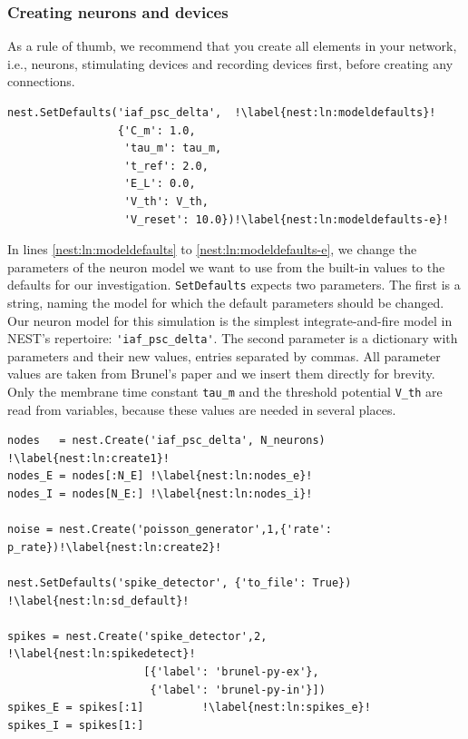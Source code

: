\documentclass{article}
\begin{document}
\subsubsection{Creating neurons and devices}

As a rule of thumb, we recommend that you create all elements in your
network, i.e., neurons, stimulating devices and recording devices
first, before creating any connections. 

\begin{lstlisting}[name=Brunel_interactive]
nest.SetDefaults('iaf_psc_delta',  !\label{nest:ln:modeldefaults}!
                 {'C_m': 1.0,
                  'tau_m': tau_m,
                  't_ref': 2.0,
                  'E_L': 0.0,
                  'V_th': V_th,
                  'V_reset': 10.0})!\label{nest:ln:modeldefaults-e}!
\end{lstlisting}

In lines \ref{nest:ln:modeldefaults} to \ref{nest:ln:modeldefaults-e},
we change the parameters of the neuron model we want to use from the
built-in values to the defaults for our investigation.
\lstinline!SetDefaults! expects two parameters. The first is a string,
naming the model for which the default parameters should be
changed. Our neuron model for this simulation is the simplest
integrate-and-fire model in NEST's repertoire:
\lstinline!'iaf_psc_delta'!. The second parameter is a dictionary with
parameters and their new values, entries separated by commas. All
parameter values are taken from Brunel's paper \citep{Brunel00} and we
insert them directly for brevity. Only the membrane time constant
\lstinline!tau_m! and the threshold potential \lstinline!V_th! are
read from variables, because these values are needed in several places.

\begin{lstlisting}[name=Brunel_interactive]
nodes   = nest.Create('iaf_psc_delta', N_neurons) !\label{nest:ln:create1}!
nodes_E = nodes[:N_E] !\label{nest:ln:nodes_e}!
nodes_I = nodes[N_E:] !\label{nest:ln:nodes_i}!

noise = nest.Create('poisson_generator',1,{'rate': p_rate})!\label{nest:ln:create2}!

nest.SetDefaults('spike_detector', {'to_file': True}) !\label{nest:ln:sd_default}!

spikes = nest.Create('spike_detector',2,    !\label{nest:ln:spikedetect}!
                     [{'label': 'brunel-py-ex'},
                      {'label': 'brunel-py-in'}])
spikes_E = spikes[:1]         !\label{nest:ln:spikes_e}!             
spikes_I = spikes[1:]
\end{lstlisting} 
\end{document}
